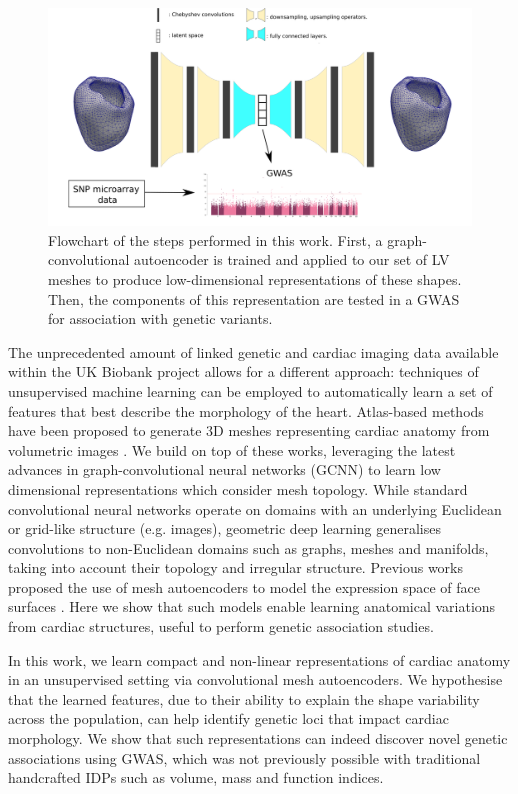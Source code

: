 \begin{figure}
\includegraphics[width=\textwidth]{figs/flowchart.png}
\caption{Flowchart of the steps performed in this work. First, a graph-convolutional autoencoder is trained and applied to our set of LV meshes to produce low-dimensional representations of these shapes. Then, the components of this representation are tested in a GWAS for association with genetic variants.}
\label{fig:flowchart}
\end{figure}

The unprecedented amount of linked genetic and cardiac imaging data available within the UK Biobank \cite{ref_ukbb} project allows for a different approach: techniques of unsupervised machine learning can be employed to automatically learn a set of features that best describe the morphology of the heart. Atlas-based methods have been proposed to generate 3D meshes representing cardiac anatomy from volumetric images \cite{ref_rahman, ref_zhuang_regis_2O10}. We build on top of these works, leveraging the latest advances in graph-convolutional neural networks (GCNN) \cite{ref_bronstein_geom_DL} to learn low dimensional representations which consider mesh topology. While standard convolutional neural networks operate on domains with an underlying Euclidean or grid-like structure (e.g. images), geometric deep learning generalises convolutions to non-Euclidean domains such as graphs, meshes and manifolds, taking into account their topology and irregular structure. Previous works proposed the use of mesh autoencoders to model the expression space of face surfaces \cite{ref_coma}. Here we show that such models enable learning anatomical variations from cardiac structures, useful to perform genetic association studies.

In this work, we learn compact and non-linear representations of cardiac anatomy in an unsupervised setting via convolutional mesh autoencoders. We hypothesise that the learned features, due to their ability to explain the shape variability across the population, can help identify genetic loci that impact cardiac morphology. We show that such representations can indeed discover novel genetic associations using GWAS, which was not previously possible with traditional handcrafted IDPs such as  volume, mass and function indices. 
